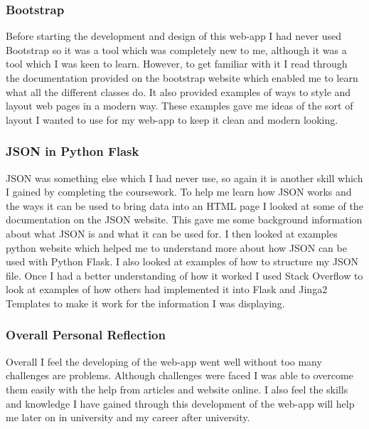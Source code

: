 \documentclass[10pt, a4paper]{article}
\begin{document}
    \subsubsection{Bootstrap}
    Before starting the development and design of this web-app I had never used Bootstrap so it was a tool which was completely new to me, although it was a tool which I was keen to learn. However, to get familiar with it I read through the documentation\cite{Bootstrap} provided on the bootstrap website which enabled me to learn what all the different classes do. It also provided examples of ways to style and layout web pages in a modern way. These examples gave me ideas of the sort of layout I wanted to use for my web-app to keep it clean and modern looking. 
    
    \subsubsection{JSON in Python Flask} 
     JSON was something else which I had never use, so again it is another skill which I gained by completing the coursework. To help me learn how JSON works and the ways it can be used to bring data into an HTML page I looked at some of the documentation\cite{JSON} on the JSON website. This gave me some background information about what JSON is and what it can be used for. I then looked at examples python website which helped me to understand more about how JSON can be used with Python Flask. I also looked at examples\cite{JSON_Examples} of how to structure my JSON file. Once I had a better understanding of how it worked I used Stack Overflow\cite{StackOverflow} to look at examples of how others had implemented it into Flask and Jinga2 Templates to make it work for the information I was displaying.

    \subsubsection{Overall Personal Reflection}
    Overall I feel the developing of the web-app went well without too many challenges are problems. Although challenges were faced I was able to overcome them easily with the help from articles and website online. I also feel the skills and knowledge I have gained through this development of the web-app will help me later on in university and my career after university.

    
    
		
\end{document}
